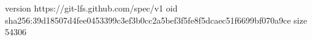 version https://git-lfs.github.com/spec/v1
oid sha256:39d18507d4fee0453399c3ef3b0cc2a5bef3f5fe8f5dcaec51f6699bf070a9ce
size 54306
